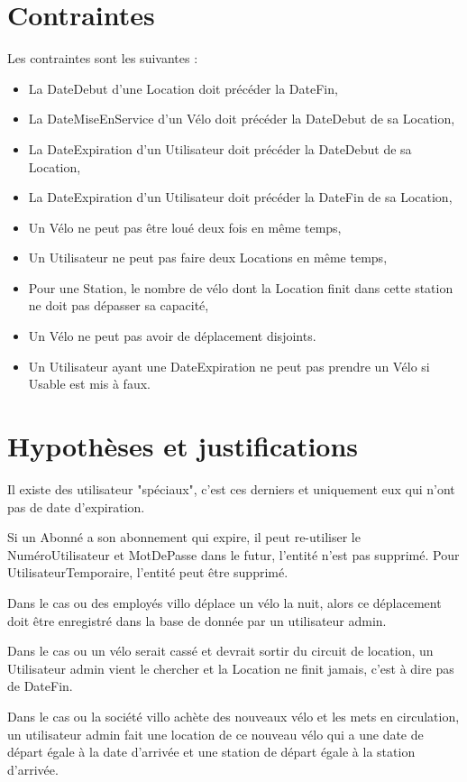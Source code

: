\documentclass[a4paper,10pt]{report}
\begin{document}
\section{Contraintes}
Les contraintes sont les suivantes :
\begin{itemize}
  \item La DateDebut d'une Location doit précéder la DateFin, 
  \item La DateMiseEnService d'un Vélo doit précéder la DateDebut de sa Location,
  \item La DateExpiration d'un Utilisateur doit précéder la DateDebut de sa Location,
  \item La DateExpiration d'un Utilisateur doit précéder la DateFin de sa Location,
  \item Un Vélo ne peut pas être loué deux fois en même temps,
  \item Un Utilisateur ne peut pas faire deux Locations en même temps,
  \item Pour une Station, le nombre de vélo dont la Location finit dans cette station ne doit pas dépasser sa capacité,
  \item Un Vélo ne peut pas avoir de déplacement disjoints.
  \item Un Utilisateur ayant une DateExpiration ne peut pas prendre un Vélo si Usable est mis à faux.
\end{itemize}
\section{Hypothèses et justifications}


Il existe des utilisateur "spéciaux", c'est ces derniers et uniquement eux qui n'ont pas de date d'expiration.

Si un Abonné a son abonnement qui expire, il peut re-utiliser le NuméroUtilisateur et MotDePasse dans le futur, l'entité n'est pas supprimé. Pour UtilisateurTemporaire, l'entité peut être supprimé.

Dans le cas ou des employés villo déplace un vélo la nuit, alors ce déplacement doit être enregistré dans la base de donnée par un utilisateur admin.

Dans le cas ou un vélo serait cassé et devrait sortir du circuit de location, un Utilisateur admin vient le chercher et la Location ne finit jamais, c'est à dire pas de DateFin.

Dans le cas ou la société villo achète des nouveaux vélo et les mets en circulation, un utilisateur admin fait une location de ce nouveau vélo qui a une date de départ égale à la date d'arrivée et une station de départ égale à la station d'arrivée.
\end{document}
